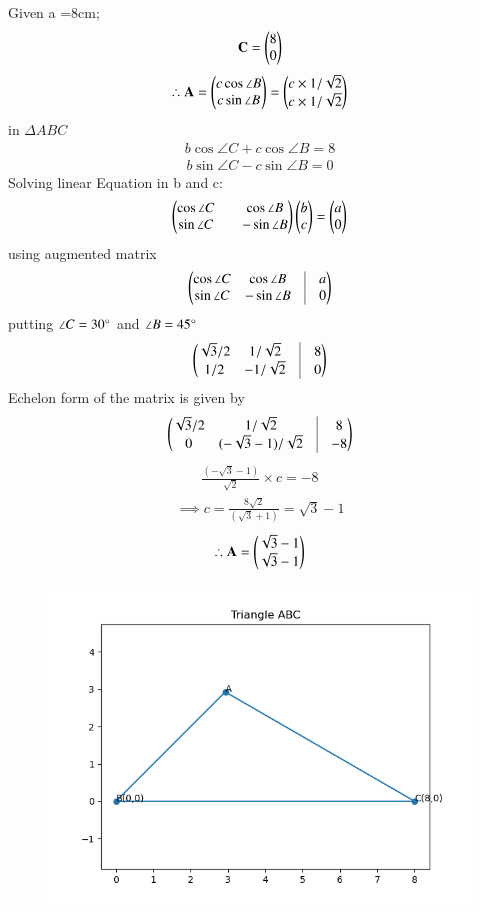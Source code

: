 \documentclass[journal]{IEEEtran}
\begin{document}
Given a =8cm;
\begin{align}
    \mathbf{C}=\begin{pmatrix}8\\0\end{pmatrix}
\end{align}
\begin{align}
    \therefore \mathbf{A}=\begin{pmatrix}c \cos \angle B\\c \sin \angle B\end{pmatrix}= \begin{pmatrix}c\times 1/\sqrt{2}\\c\times 1/\sqrt{2}\end{pmatrix}
\end{align}
in $\Delta ABC$
\begin{align}
   b \cos \angle C + c \cos \angle B = 8
\end{align}
\begin{align}
    b \sin \angle C - c \sin \angle B = 0
\end{align}
Solving linear Equation in b and c:
\begin{align}
    \begin{pmatrix}\cos \angle C && \cos \angle B \\
    \sin \angle C && -\sin \angle B\end{pmatrix} \begin{pmatrix}b \\ c\end{pmatrix} = \begin{pmatrix}a\\0\end{pmatrix}
\end{align}
using augmented matrix
\begin{align}
     \myvec{\cos \angle C & \cos \angle B &\vrule &a \\
    \sin \angle C & -\sin \angle B &\vrule &0} \\
\end{align}
putting $\angle C = 30\degree$ and $\angle B = 45\degree$
\begin{align}
    \myvec{\sqrt{3}/2 & 1/\sqrt{2} &\vrule &8 \\
    1/2 & -1/\sqrt{2} &\vrule &0}
\end{align}
Echelon form of the matrix is given by 
\begin{align}
    \myvec{\sqrt{3}/2 & 1/\sqrt{2} &\vrule &8 \\
    0 & (-\sqrt{3}-1)/\sqrt{2} &\vrule &-8}
\end{align}
\begin{align}
    \frac{(-\sqrt{3}-1)}{\sqrt{2}} \times c = -8
    \end{align}
    \begin{align}
        \implies c = \frac{8\sqrt{2}}{(\sqrt{3}+1)} = \sqrt{3}-1
    \end{align}
    \begin{align}
        \therefore \mathbf{A}=\begin{pmatrix}\sqrt{3}-1 \\ 
        \sqrt{3}-1\end{pmatrix}
    \end{align}
  
\begin{figure}[H]
    \centering
    \includegraphics[width=0.8\columnwidth]{figs/fig.png}   
    \label{fig-1}
\end{figure}

 
\end{document}
